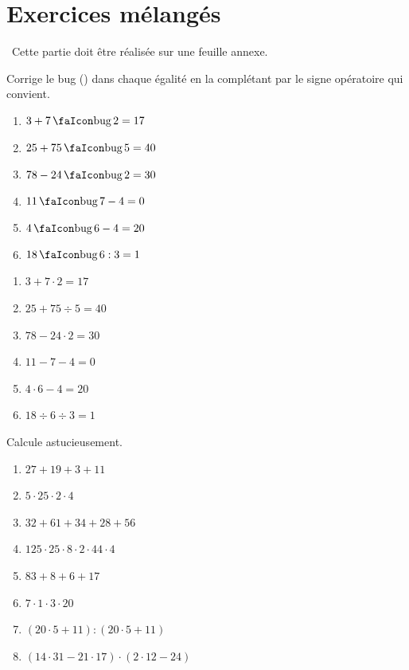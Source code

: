 \documentclass[../../syllabus_1.tex]{subfiles}
\begin{document}
\section{Exercices mélangés}
~Cette partie doit être réalisée sur une feuille annexe.

\setcounter{exercise}{0}

\begin{exercise}
    Corrige le bug () dans chaque égalité en la complétant par le signe opératoire qui convient.
    \begin{enumerate}[cols=3]
        \item \(3 + 7 \invi 2 = 17\)
        \item \(25 + 75 \invi 5 = 40\)
        \item \(78 - 24 \invi 2 = 30\)
        \item \(11 \invi 7 - 4 = 0\)
        \item \(4 \invi 6 - 4 = 20\)
        \item \(18 \invi 6 : 3 = 1\)
    \end{enumerate}
\end{exercise}
\begin{solution}
    \begin{enumerate}
        \item \(3 + 7 \cdot 2 = 17\)
        \item \(25 + 75 \div 5 = 40\)
        \item \(78 - 24 \cdot 2 = 30\)
        \item \(11 - 7 - 4 = 0\)
        \item \(4 \cdot 6 - 4 = 20\)
        \item \(18 \div 6 \div 3 = 1\)
    \end{enumerate}
\end{solution}
\begin{exercise}
    Calcule astucieusement.
    \begin{enumerate}[cols=2]
        \item \(27 + 19 + 3 + 11\)
        \item \(5 \cdot 25 \cdot 2 \cdot 4\)
        \item \(32 + 61 + 34 + 28 + 56\)
        \item \(125 \cdot 25 \cdot 8 \cdot 2  \cdot 44 \cdot 4\)
        \item \(83 + 8 + 6 + 17\)
        \item \(7 \cdot 1 \cdot 3 \cdot 20\)
        \item \(\left(20 \cdot 5 + 11\right) : \left(20  \cdot 5 + 11\right)\)
        \item \(\left(14 \cdot 31 - 21 \cdot 17\right) \cdot \left( 2 \cdot 12 - 24\right)\)
    \end{enumerate}
\end{exercise}
\end{document}
